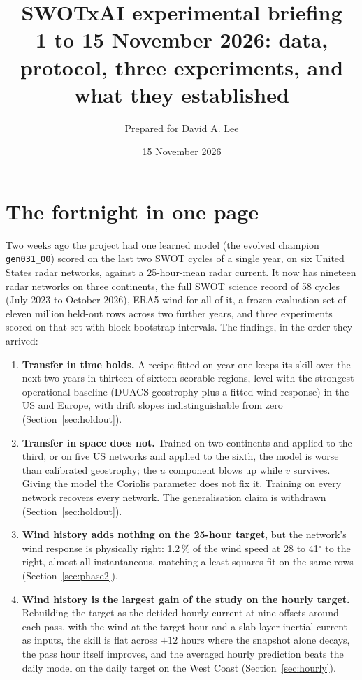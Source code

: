 \documentclass[11pt]{article}
\title{SWOTxAI experimental briefing\\ \large 1 to 15 November 2026: data, protocol, three experiments, and what they established}
\author{Prepared for David A. Lee}
\date{15 November 2026}
\newcommand{\code}[1]{\texttt{#1}}
\begin{document}
\maketitle
\tableofcontents

\section{The fortnight in one page}

Two weeks ago the project had one learned model (the evolved champion \code{gen031\_00}) scored on the last two SWOT cycles of a single year, on six United States radar networks, against a 25-hour-mean radar current. It now has nineteen radar networks on three continents, the full SWOT science record of 58 cycles (July 2023 to October 2026), ERA5 wind for all of it, a frozen evaluation set of eleven million held-out rows across two further years, and three experiments scored on that set with block-bootstrap intervals. The findings, in the order they arrived:

\begin{enumerate}
  \item \textbf{Transfer in time holds.} A recipe fitted on year one keeps its skill over the next two years in thirteen of sixteen scorable regions, level with the strongest operational baseline (DUACS geostrophy plus a fitted wind response) in the US and Europe, with drift slopes indistinguishable from zero (Section~\ref{sec:holdout}).
  \item \textbf{Transfer in space does not.} Trained on two continents and applied to the third, or on five US networks and applied to the sixth, the model is worse than calibrated geostrophy; the $u$ component blows up while $v$ survives. Giving the model the Coriolis parameter does not fix it. Training on every network recovers every network. The generalisation claim is withdrawn (Section~\ref{sec:holdout}).
  \item \textbf{Wind history adds nothing on the 25-hour target}, but the network's wind response is physically right: 1.2\,\% of the wind speed at 28 to 41$^\circ$ to the right, almost all instantaneous, matching a least-squares fit on the same rows (Section~\ref{sec:phase2}).
  \item \textbf{Wind history is the largest gain of the study on the hourly target.} Rebuilding the target as the detided hourly current at nine offsets around each pass, with the wind at the target hour and a slab-layer inertial current as inputs, the skill is flat across $\pm12$ hours where the snapshot alone decays, the pass hour itself improves, and the averaged hourly prediction beats the daily model on the daily target on the West Coast (Section~\ref{sec:hourly}).
\end{enumerate}
\end{document}
